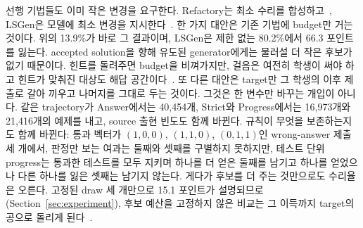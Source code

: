 \documentclass[10pt,conference]{IEEEtran}
\begin{document}
선행 기법들도 이미 작은 변경을 요구한다. Refactory는 최소 수리를 합성하고~\cite{hu2019re}, LSGen은 모델에 최소 변경을 지시한다~\cite{dai2026learner}. 한 가지 대안은 기존 기법에 budget만 거는 것이다. 위의 13.9\%가 바로 그 결과이며, LSGen은 제한 없는 80.2\%에서 66.3 포인트를 잃는다. accepted solution을 향해 유도된 generator에게는 물러설 더 작은 후보가 없기 때문이다. 힌트를 돌려주면 budget을 비껴가지만, 걸음은 여전히 학생이 써야 하고 힌트가 맞춰진 대상도 해답 공간이다~\cite{rivers2017data,price2017isnap,roest2024next}. 또 다른 대안은 target만 그 학생의 이후 제출로 갈아 끼우고 나머지를 그대로 두는 것이다. 그것은 한 변수만 바꾸는 개입이 아니다. 같은 trajectory가 Answer에서는 40,454개, Strict와 Progress에서는 16,973개와 21,416개의 예제를 내고, source 출현 빈도도 함께 바뀐다. 규칙이 무엇을 보존하는지도 함께 바뀐다: 통과 벡터가 \((1,0,0)\), \((1,1,0)\), \((0,1,1)\)인 wrong-answer 제출 세 개에서, 판정만 보는 여과는 둘째와 셋째를 구별하지 못하지만, 테스트 단위 progress는 통과한 테스트를 모두 지키며 하나를 더 얻은 둘째를 남기고 하나를 얻었으나 다른 하나를 잃은 셋째는 남기지 않는다. 게다가 후보를 더 주는 것만으로도 수리율은 오른다. 고정된 draw 세 개만으로 15.1 포인트가 설명되므로(Section~\ref{sec:experiment}), 후보 예산을 고정하지 않은 비교는 그 이득까지 target의 공으로 돌리게 된다~\cite{zhang2024pydex,koutcheme2024benchmarking,yang2024cref,orvalho2025counterexample,dai2026learner}.
\end{document}
